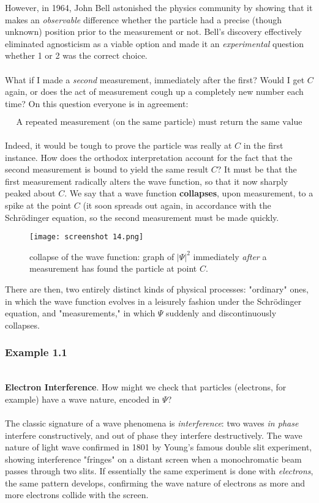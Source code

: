 \documentclass[svgnames]{article}   	%
\begin{document}
However, in 1964, John Bell astonished the physics community by showing that it
makes an \textit{observable} difference whether the particle had a precise
(though unknown) position prior to the measurement or not. Bell's discovery
effectively eliminated agnosticism as a viable option and made it an
\textit{experimental} question whether 1 or 2 was the correct choice. \\\\

What if I made a \textit{second} measurement, immediately after the first?
Would I get $C$ again, or does the act of measurement cough up a completely new
number each time? On this question everyone is in agreement: 

\[
\text{A repeated measurement (on the same particle) must return the same
value}    
\]\\

Indeed, it would be tough to prove the particle was really at $C$ in the first
instance. How does the orthodox interpretation account for the fact that the
second measurement is bound to yield the same result $C$? It must be that the
first measurement radically alters the wave function, so that it now sharply
peaked about $C$. We say that a wave function \textbf{collapses}, upon
measurement, to a spike at the point $C$ (it soon spreads out again, in
accordance with the Schr\"{o}dinger equation, so the second measurement must be
made quickly. 
\vspace{20px}
\begin{figure}[hb!]
  \centering
    \texttt{[image: screenshot 14.png]}
    \caption{collapse of the wave function: graph of $|\Psi|^2$ immediately
    \textit{after} a measurement has found the particle at point $C$.}
\end{figure}
\vspace{20px}
There are then, two entirely distinct kinds of physical processes: "ordinary"
ones, in which the wave function evolves in a leisurely fashion under the
Schr\"{o}dinger equation, and "measurements," in which $\Psi$ suddenly and
discontinuously collapses. 


\subsubsection{Example 1.1} \mbox{}\\

\textbf{Electron Interference}. How might we check that particles (electrons,
for example) have a wave nature, encoded in $\Psi$? \\\\
The classic signature of a wave phenomena is \textit{interference}: two waves
\textit{in phase} interfere constructively, and out of phase they interfere
destructively. The wave nature of light wave confirmed in 1801 by Young's
famous double slit experiment, showing interference "fringes" on a distant
screen when a monochromatic beam passes through two slits. If essentially the
same experiment is done with \textit{electrons}, the same pattern develops,
confirming the wave nature of electrons as more and more electrons collide with
the screen. 
\end{document}
